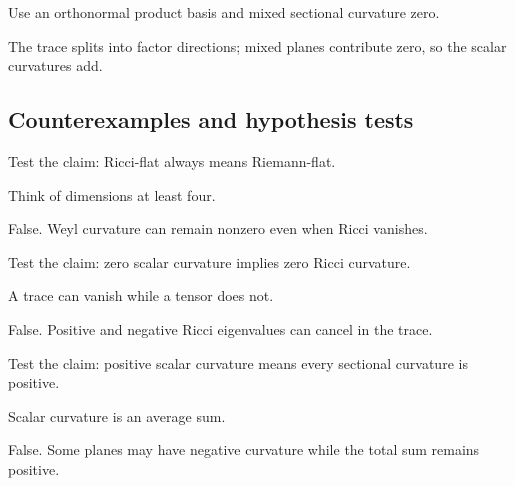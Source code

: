 \begin{hint}
Use an orthonormal product basis and mixed sectional curvature zero.
\end{hint}

\begin{solution}
The trace splits into factor directions; mixed planes contribute zero, so the scalar curvatures add.
\end{solution}

\subsection*{Counterexamples and hypothesis tests}

\begin{exercise}\label{exr:vii27-ped-10}
Test the claim: Ricci-flat always means Riemann-flat.
\end{exercise}

\begin{hint}
Think of dimensions at least four.
\end{hint}

\begin{solution}
False.  Weyl curvature can remain nonzero even when Ricci vanishes.
\end{solution}

\begin{exercise}\label{exr:vii27-ped-11}
Test the claim: zero scalar curvature implies zero Ricci curvature.
\end{exercise}

\begin{hint}
A trace can vanish while a tensor does not.
\end{hint}

\begin{solution}
False.  Positive and negative Ricci eigenvalues can cancel in the trace.
\end{solution}

\begin{exercise}\label{exr:vii27-ped-12}
Test the claim: positive scalar curvature means every sectional curvature is positive.
\end{exercise}

\begin{hint}
Scalar curvature is an average sum.
\end{hint}

\begin{solution}
False.  Some planes may have negative curvature while the total sum remains positive.
\end{solution}

